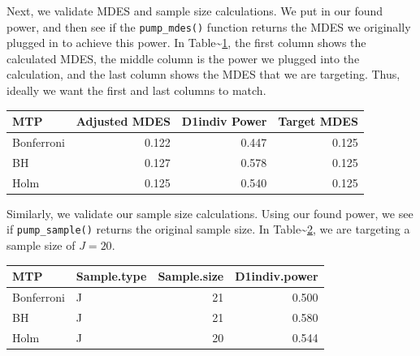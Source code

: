 \documentclass[
]{article}
\begin{document}
Next, we validate MDES and sample size calculations. We put in our found
power, and then see if the \texttt{pump\_mdes()} function returns the
MDES we originally plugged in to achieve this power. In
Table\textasciitilde{}\ref{tab:mdes}, the first column shows the
calculated MDES, the middle column is the power we plugged into the
calculation, and the last column shows the MDES that we are targeting.
Thus, ideally we want the first and last columns to match.

\begin{table}[h!]
\centering
\begin{tabular}{lrrr}
MTP & Adjusted MDES & D1indiv Power & Target MDES\\
\hline
Bonferroni & 0.122 & 0.447 & 0.125\\
BH & 0.127 & 0.578 & 0.125\\
Holm & 0.125 & 0.540 & 0.125
\end{tabular}
\label{tab:mdes}
\end{table}

Similarly, we validate our sample size calculations. Using our found
power, we see if \texttt{pump\_sample()} returns the original sample
size. In Table\textasciitilde{}\ref{tab:ss}, we are targeting a sample
size of \(J = 20\).

\begin{table}[h!]
\centering
\begin{tabular}{llrr}
MTP & Sample.type & Sample.size & D1indiv.power\\
\hline
Bonferroni & J & 21 & 0.500\\
BH & J & 21 & 0.580\\
Holm & J & 20 & 0.544
\end{tabular}
\label{tab:ss}
\end{table}
\end{document}
